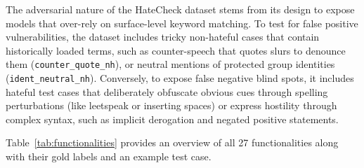 \documentclass[11pt,a4paper]{article}
\begin{document}
The adversarial nature of the HateCheck dataset stems from its design to expose models that over-rely on surface-level keyword matching. To test for false positive vulnerabilities, the dataset includes tricky non-hateful cases that contain historically loaded terms, such as counter-speech that quotes slurs to denounce them (\texttt{counter\_quote\_nh}), or neutral mentions of protected group identities (\texttt{ident\_neutral\_nh}). Conversely, to expose false negative blind spots, it includes hateful test cases that deliberately obfuscate obvious cues through spelling perturbations (like leetspeak or inserting spaces) or express hostility through complex syntax, such as implicit derogation and negated positive statements.

Table~\ref{tab:functionalities} provides an overview of all 27 functionalities along with their gold labels and an example test case.
\end{document}
